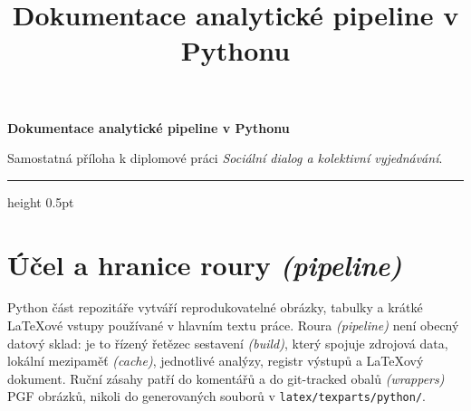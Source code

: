 \documentclass[
  a4paper, 10pt,
  master,
  final,
  notitlepage,
  noheader,
  nofrontmatter,
  noacro,
  nobibliography,
  nosoftware,
  nobackmatter,
  CTUend
]{CTUthesis}
\title{Dokumentace analytické pipeline v Pythonu}
\begin{document}
\pagestyle{plain}
\small

{\sffamily\bfseries\LARGE\color{CTUblue} Dokumentace analytické pipeline v Pythonu\par}
{\sffamily\color{CTUgrey} Samostatná příloha k diplomové práci \textit{Sociální dialog a kolektivní vyjednávání}.\par}
\vspace{0.4\baselineskip}
\hrule height 0.5pt
\vspace{0.8\baselineskip}

\section*{Účel a hranice roury \textit{(pipeline)}}
Python část repozitáře vytváří reprodukovatelné obrázky, tabulky a krátké
\LaTeX{}ové vstupy používané v hlavním textu práce. Roura \textit{(pipeline)} není obecný datový
sklad: je to řízený řetězec sestavení \textit{(build)}, který spojuje zdrojová
data, lokální mezipaměť \textit{(cache)}, jednotlivé analýzy, registr výstupů
a \LaTeX{}ový dokument. Ruční zásahy patří do komentářů a do git-tracked
obalů \textit{(wrappers)} PGF obrázků, nikoli do generovaných souborů
v \texttt{latex/texparts/python/}.

\begin{center}
\end{center}
\end{document}
